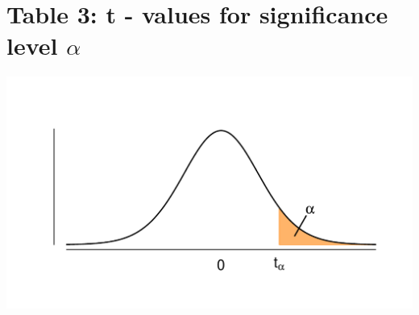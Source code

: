 \section{Table 3: t - values for significance level $\alpha$}
\label{table3}

\vspace*{-30pt}
\begin{minipage}{0.6\textwidth}
\hfill
\end{minipage}
\begin{minipage}{0.4\textwidth}
\includegraphics[width=\textwidth]{Files/Images/tdist.pdf}
\end{minipage}

